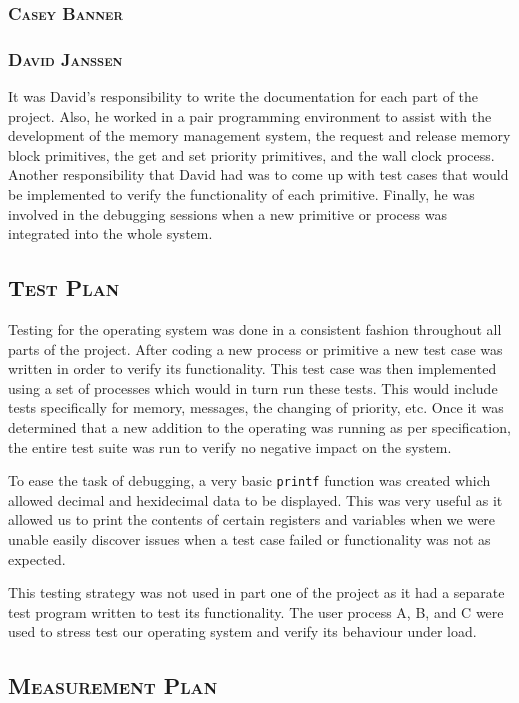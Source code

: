 \documentclass[oneside]{report}
\begin{document}
\subsubsection{\textsc{Casey Banner}}

\subsubsection{\textsc{David Janssen}}
It was David's responsibility to write the documentation for each part of the 
project. Also, he worked in a pair programming environment to assist with the 
development of the memory management system, the request and release memory 
block primitives, the get and set priority primitives, and the wall clock 
process. Another responsibility that David had was to come up with test 
cases that would be implemented to verify the functionality of each primitive. 
Finally, he was involved in the debugging sessions when a new primitive or 
process was integrated into the whole system.  

\subsection{\textsc{Test Plan}}
Testing for the operating system was done in a consistent fashion throughout all
parts of the project. After coding a new process or primitive a new test case 
was written in order to verify its functionality. This test case was then 
implemented using a set of processes which would in turn run these tests. This 
would include tests specifically for memory, messages, the changing of priority, 
etc. Once it was determined that a new addition to the operating was running as 
per specification, the entire test suite was run to verify no negative impact on 
the system. 

To ease the task of debugging, a very basic \texttt{printf} function 
was created which allowed decimal and hexidecimal data to be displayed. This 
was very useful as it allowed us to print the contents of certain registers and 
variables when we were unable easily discover issues when a test case failed or 
functionality was not as expected. 

This testing strategy was not used in part one of the project as it had a 
separate test program written to test its functionality. The user process A, B, 
and C were used to stress test our operating system and verify its behaviour 
under load. 

\subsection{\textsc{Measurement Plan}}
\label{measurementplan}
\end{document}
